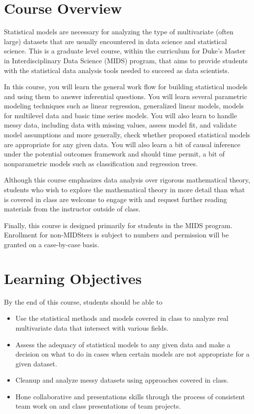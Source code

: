 \documentclass[11pt, a4paper]{article}
\begin{document}
\section{Course Overview}
Statistical models are necessary for analyzing the type of multivariate (often large) datasets that are usually encountered in data science and statistical science. This is a graduate level course, within the curriculum for Duke's Master in Interdisciplinary Data Science (MIDS) program, that aims to provide students with the statistical data analysis tools needed to succeed as data scientists. 

In this course, you will learn the general work flow for building statistical models and using them to answer inferential questions. You will learn several parametric modeling techniques such as linear regression, generalized linear models, models for multilevel data and basic time series models. You will also learn to handle messy data, including data with missing values, assess model fit, and validate model assumptions and more generally, check whether proposed statistical models are appropriate for any given data. You will also learn a bit of causal inference under the potential outcomes framework and should time permit, a bit of nonparametric models such as classification and regression trees. 

Although this course emphasizes data analysis over rigorous mathematical theory, students who wish to explore the mathematical theory in more detail than what is covered in class are welcome to engage with and request further reading materials from the instructor outside of class.

Finally, this course is designed primarily for students in the MIDS program. Enrollment for non-MIDSters is subject to numbers and permission will be granted on a case-by-case basis.

\section{Learning Objectives}
By the end of this course, students should be able to
\begin{itemize}[label= {\color{darkblue}{\ArrowBoldRightStrobe}}]
	\item Use the statistical methods and models covered in class to analyze real multivariate data that intersect with various fields. 
	\item Assess the adequacy of statistical models to any given data and make a decision on what to do in cases when certain models are not appropriate for a given dataset.
	\item Cleanup and analyze messy datasets using approaches covered in class.
	\item Hone collaborative and presentations skills through the process of consistent team work on and class presentations of team projects.
\end{itemize}
\end{document}
